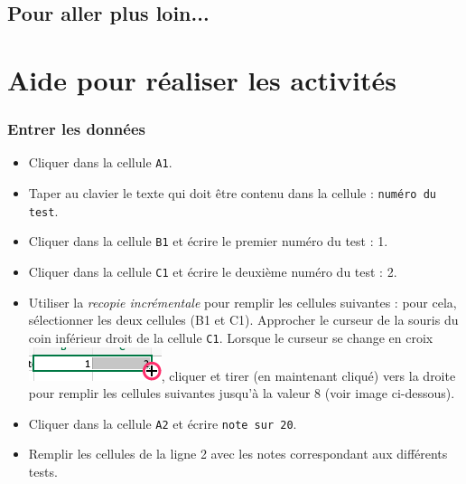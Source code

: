 \subsection{Pour aller plus loin...}



%
%
%
%

\newpage

\section{Aide pour réaliser les activités}\label{aideExcel}

\subsubsection{Entrer les données}

\begin{itemize}
\item Cliquer dans la cellule \texttt{A1}.
\item Taper au clavier le texte qui doit être contenu dans la cellule : \texttt{numéro du test}.
\item Cliquer dans la cellule \texttt{B1} et écrire le premier numéro du test : 1.
\item Cliquer dans la cellule \texttt{C1} et écrire le deuxième numéro du test : 2.
\item Utiliser la \emph{recopie incrémentale} pour remplir les cellules suivantes : pour cela, sélectionner les deux cellules (B1 et C1). Approcher le curseur de la souris du coin inférieur droit de la cellule \texttt{C1}. Lorsque le curseur se change en croix
\includegraphics[scale=.4]{./images/tableur/recopieIncrementale_Excel_crop}, cliquer et tirer (en maintenant cliqué) vers la droite pour remplir les cellules suivantes jusqu'à la valeur 8 (voir image ci-dessous).
\end{itemize}


\begin{itemize}
\item Cliquer dans la cellule \texttt{A2} et écrire \texttt{note sur 20}.
\item Remplir les cellules de la ligne 2 avec les notes correspondant aux différents tests.
\end{itemize}





